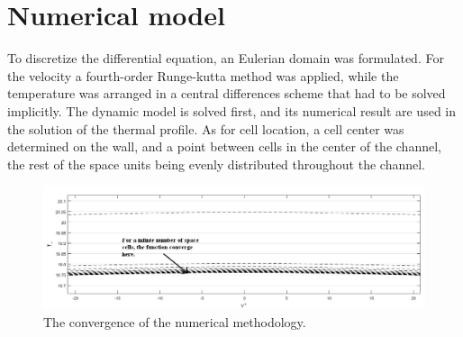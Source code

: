 \documentclass[10pt]{article} %
\begin{document}
\section{Numerical model}


To discretize the differential equation, an Eulerian domain was formulated. For the velocity a fourth-order Runge-kutta method was applied, while the temperature was arranged in a central differences scheme that had to be solved implicitly. The dynamic model is solved first, and its numerical result are used in the solution of the thermal profile. As for cell location, a cell center was determined on the wall, and a point between cells in the center of the channel, the rest of the space units being evenly distributed throughout the channel.
\begin{figure}[!h]
	\centering
	\includegraphics[angle=0, trim={20mm 10mm 0mm 0mm}, clip , scale=0.5]{convergnciaprimeira}
	\caption{The convergence of the numerical methodology.}
	\label{sistema}
\end{figure}
\end{document}
